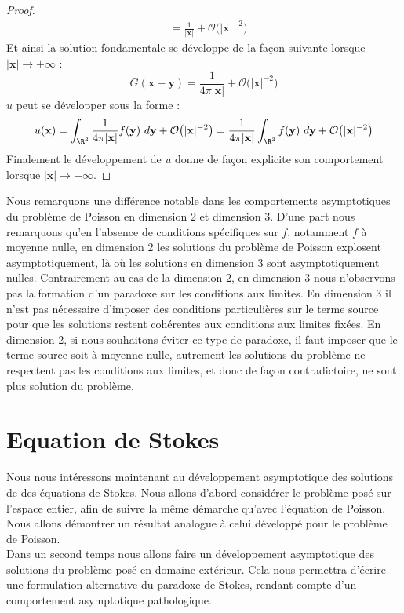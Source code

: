 \begin{proof}
\begin{align*}
    &= \frac{1}{|\mathbf{x}|} + \mathcal{O}\big(|\mathbf{x}|^{-2}\big)
\end{align*}
Et ainsi la solution fondamentale se développe de la façon suivante lorsque $|\mathbf{x}| \to +\infty$ :
$$G(\mathbf{x - y}) = \frac{1}{4\pi|\mathbf{x}|} + \mathcal{O}\big( |\mathbf{x}|^{-2} \big) $$
$u$ peut se développer sous la forme :
$$u(\mathbf{x}) = \int_{\R^3} \frac{1}{4\pi|\mathbf{x}|}f(\mathbf{y}) \ d\mathbf{y} + \mathcal{O}\big( |\mathbf{x}|^{-2} \big) = \frac{1}{4\pi |\mathbf{x}|}\int_{\R^3} f(\mathbf{y}) \ d\mathbf{y} + \mathcal{O}\big( |\mathbf{x}|^{-2} \big) $$
Finalement le développement de $u$ donne de façon explicite son comportement lorsque $|\mathbf{x}| \to +\infty$.
\end{proof}
Nous remarquons une différence notable dans les comportements asymptotiques du problème de Poisson en dimension 2 et dimension 3. D'une part nous remarquons qu'en l'absence de conditions spécifiques sur $f$, notamment $f$ à moyenne nulle,
en dimension 2 les solutions du problème de Poisson explosent asymptotiquement, là où les solutions en dimension 3 sont asymptotiquement nulles.
Contrairement au cas de la dimension 2, en dimension 3 nous n'observons pas la formation d'un paradoxe sur les conditions aux limites. En dimension 3 il n'est pas nécessaire d'imposer des conditions particulières sur le terme source pour que les solutions restent cohérentes aux conditions aux limites fixées.
En dimension 2, si nous souhaitons éviter ce type de paradoxe, il faut imposer que le terme source soit à moyenne nulle, autrement les solutions du problème ne respectent pas les conditions aux limites, et donc de façon contradictoire, ne sont plus solution du problème. 


\section{Equation de Stokes}

Nous nous intéressons maintenant au développement asymptotique des solutions de des équations de Stokes. 
Nous allons d'abord considérer le problème posé sur l'espace entier, afin de suivre la même démarche qu'avec l'équation de Poisson. Nous allons démontrer un résultat analogue à celui développé pour le problème de Poisson.\\
Dans un second temps nous allons faire un développement asymptotique des solutions du problème posé en domaine extérieur. Cela nous permettra d'écrire une formulation alternative du paradoxe de Stokes, rendant compte d'un comportement asymptotique pathologique.


